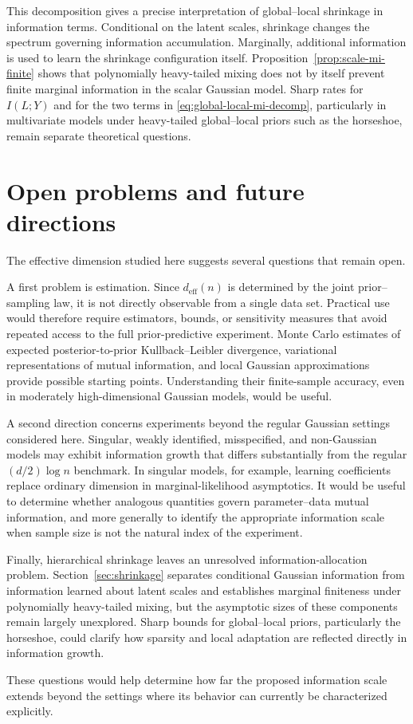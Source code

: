\documentclass[11pt]{article}
\theoremstyle{plain}
\theoremstyle{definition}
\theoremstyle{remark}
\begin{document}
This decomposition gives a precise interpretation of global--local shrinkage in information terms. Conditional on the latent scales, shrinkage changes the spectrum governing information accumulation. Marginally, additional information is used to learn the shrinkage configuration itself. Proposition~\ref{prop:scale-mi-finite} shows that polynomially heavy-tailed mixing does not by itself prevent finite marginal information in the scalar Gaussian model. Sharp rates for \(I(L;Y)\) and for the two terms in \eqref{eq:global-local-mi-decomp}, particularly in multivariate models under heavy-tailed global--local priors such as the horseshoe, remain separate theoretical questions.

\section{Open problems and future directions}
\label{sec:open-problems}

The effective dimension studied here suggests several questions that remain open.

A first problem is estimation. Since \(d_{\mathrm{eff}}(n)\) is determined by the joint prior--sampling law, it is not directly observable from a single data set. Practical use would therefore require estimators, bounds, or sensitivity measures that avoid repeated access to the full prior-predictive experiment. Monte Carlo estimates of expected posterior-to-prior Kullback--Leibler divergence, variational representations of mutual information, and local Gaussian approximations provide possible starting points. Understanding their finite-sample accuracy, even in moderately high-dimensional Gaussian models, would be useful.

A second direction concerns experiments beyond the regular Gaussian settings considered here. Singular, weakly identified, misspecified, and non-Gaussian models may exhibit information growth that differs substantially from the regular \((d/2)\log n\) benchmark. In singular models, for example, learning coefficients replace ordinary dimension in marginal-likelihood asymptotics. It would be useful to determine whether analogous quantities govern parameter--data mutual information, and more generally to identify the appropriate information scale when sample size is not the natural index of the experiment.

Finally, hierarchical shrinkage leaves an unresolved information-allocation problem. Section~\ref{sec:shrinkage} separates conditional Gaussian information from information learned about latent scales and establishes marginal finiteness under polynomially heavy-tailed mixing, but the asymptotic sizes of these components remain largely unexplored. Sharp bounds for global--local priors, particularly the horseshoe, could clarify how sparsity and local adaptation are reflected directly in information growth.

These questions would help determine how far the proposed information scale extends beyond the settings where its behavior can currently be characterized explicitly.




\end{document}
